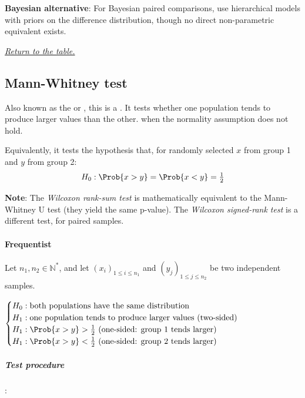 \textbf{Bayesian alternative}: For Bayesian paired comparisons, use hierarchical models with
priors on the difference distribution, though no direct non-parametric equivalent exists.

\textit{\hyperref[statistical_method_table]{Return to the table.}}

\subsection{Mann-Whitney test}

Also known as the  or , this is a
. It tests whether one
population tends to produce larger values than the other.  when the normality assumption does not hold.

Equivalently, it tests the hypothesis that, for randomly selected $x$ from group 1 and
$y$ from group 2:
$$H_0: \Prob{x > y} = \Prob{x < y} = \tfrac{1}{2}$$

\textbf{Note}: The \emph{Wilcoxon rank-sum test} is mathematically equivalent to the
Mann-Whitney U test (they yield the same p-value). The \emph{Wilcoxon signed-rank test}
is a different test, for paired samples.

\paragraph{Frequentist}

Let $n_1, n_2 \in \mathbb{N}^*$, and let $\left(x_i\right)_{1 \leq i \leq n_1}$ and
$\left(y_j\right)_{1 \leq j \leq n_2}$ be two independent samples.

$\begin{cases}
    H_0: \text{both populations have the same distribution} \\
    H_1: \text{one population tends to produce larger values (two-sided)} \\
    H_1: \Prob{x > y} > \tfrac{1}{2} \text{ (one-sided: group 1 tends larger)} \\
    H_1: \Prob{x > y} < \tfrac{1}{2} \text{ (one-sided: group 2 tends larger)}
\end{cases}$

\subparagraph{Test procedure}:

